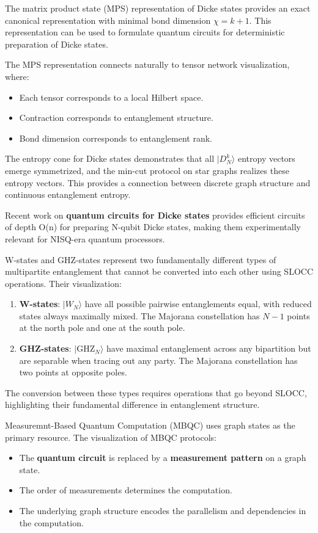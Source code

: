 \documentclass[%
 amsmath,amssymb,
 aps,
rmp,
]{revtex4-2}
\begin{document}
The matrix product state (MPS) representation of Dicke states provides an exact canonical representation with minimal bond dimension $\chi = k+1$. This representation can be used to formulate quantum circuits for deterministic preparation of Dicke states.

The MPS representation connects naturally to tensor network visualization, where:
\begin{itemize}
	\item Each tensor corresponds to a local Hilbert space.
	\item Contraction corresponds to entanglement structure.
	\item Bond dimension corresponds to entanglement rank.
\end{itemize}

The entropy cone for Dicke states demonstrates that all $|D_N^k\rangle$ entropy vectors emerge symmetrized, and the min-cut protocol on star graphs realizes these entropy vectors. This provides a connection between discrete graph structure and continuous entanglement entropy.

Recent work on \textbf{quantum circuits for Dicke states} provides efficient circuits of depth O(n) for preparing N-qubit Dicke states, making them experimentally relevant for NISQ-era quantum processors.

W-states and GHZ-states represent two fundamentally different types of multipartite entanglement that cannot be converted into each other using SLOCC operations. Their visualization:

\begin{enumerate}
	\item \textbf{W-states}: $|W_N\rangle$ have all possible pairwise entanglements equal, with reduced states always maximally mixed. The Majorana constellation has $N-1$ points at the north pole and one at the south pole.

	\item \textbf{GHZ-states}: $|\text{GHZ}_N\rangle$ have maximal entanglement across any bipartition but are separable when tracing out any party. The Majorana constellation has two points at opposite poles.
\end{enumerate}

The conversion between these types requires operations that go beyond SLOCC, highlighting their fundamental difference in entanglement structure.

Measuremnt-Based Quantum Computation (MBQC) uses graph states as the primary resource. The visualization of MBQC protocols:
\begin{itemize}
	\item The \textbf{quantum circuit} is replaced by a \textbf{measurement pattern} on a graph state.
	\item The order of measurements determines the computation.
	\item The underlying graph structure encodes the parallelism and dependencies in the computation.
\end{itemize}
\end{document}

